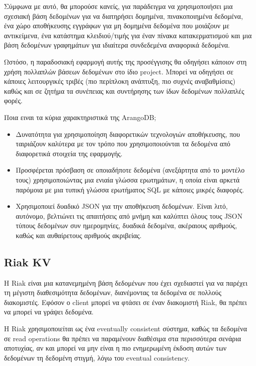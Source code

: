 \documentclass[conference]{IEEEtran}
\begin{document}
Σύμφωνα με αυτό, θα μπορούσε κανείς, για παράδειγμα να χρησιμοποιήσει μια σχεσιακή βάση δεδομένων για να διατηρήσει δομημένα, πινακοποιημένα δεδομένα, ένα χώρο αποθήκευσης εγγράφων για μη δομημένα δεδομένα που μοιάζουν με αντικείμενα, ένα κατάστημα κλειδιού/τιμής για έναν πίνακα κατακερματισμού και μια βάση δεδομένων γραφημάτων για ιδιαίτερα συνδεδεμένα αναφορικά δεδομένα.

Ωστόσο, η παραδοσιακή εφαρμογή αυτής της προσέγγισης θα οδηγήσει κάποιον στη χρήση πολλαπλών βάσεων δεδομένων στο ίδιο project. Μπορεί να οδηγήσει σε κάποιες λειτουργικές τριβές (πιο περίπλοκη ανάπτυξη, πιο συχνές αναβαθμίσεις) καθώς και σε ζητήμα τα συνέπειας και συντήρησης των ίδων δεδομένων πολλαπλές φορές.

Ποια ειναι τα κύρια χαρακτηριστικά της ArangoDB;
\begin{itemize}
    \item 
    Δυνατότητα για χρησιμοποίηση διαφορετικών τεχνολογιών αποθήκευσης, που ταιριάζουν καλύτερα με τον τρόπο που χρησιμοποιούνται τα δεδομένα από διαφορετικά στοιχεία της εφαρμογής.
    
    \item 
    Προσφέρεται πρόσβαση σε οποιαδήποτε δεδομένα (ανεξάρτητα από το μοντέλο τους) χρησιμοποιώντας μια ενιαία γλώσσα ερωτημάτων, η οποία είναι αρκετά παρόμοια με μια τυπική γλώσσα ερωτήματος SQL με κάποιες μικρές διαφορές.

    \item 
    Χρησιμοποιεί δυαδικό JSON για την αποθήκευση δεδομένων. Είναι λιτό, αυτόνομο, βελτιώνει τις απαιτήσεις από μνήμη και καλύπτει όλους τους JSON τύπους δεδομένων συν ημερομηνίες, δυαδικά δεδομένα, ακέραιους αριθμούς, καθώς και αυθαίρετους αριθμούς ακριβείας.
\end{itemize}

\subsection{Riak KV}

 Η Riak είναι μια κατανεμημένη βάση δεδομένων που έχει σχεδιαστεί για να παρέχει τη μέγιστη διαθεσιμότητα δεδομένων, διανέμοντας τα δεδομένα σε πολλούς διακομιστές. Εφόσον ο client μπορεί να φτάσει σε έναν διακομιστή Riak, θα πρέπει να μπορεί να γράψει δεδομένα.

H Riak χρησιμοποιείται ως ένα eventually consistent σύστημα, καθώς τα δεδομένα σε read operations θα πρέπει να παραμένουν διαθέσιμα στα περισσότερα σενάρια αποτυχίας, αν και μπορεί να μην είναι η πιο ενημερωμένη έκδοση αυτών των δεδομένων τη δεδομένη στιγμή, λόγω του eventual consistency.
\end{document}
